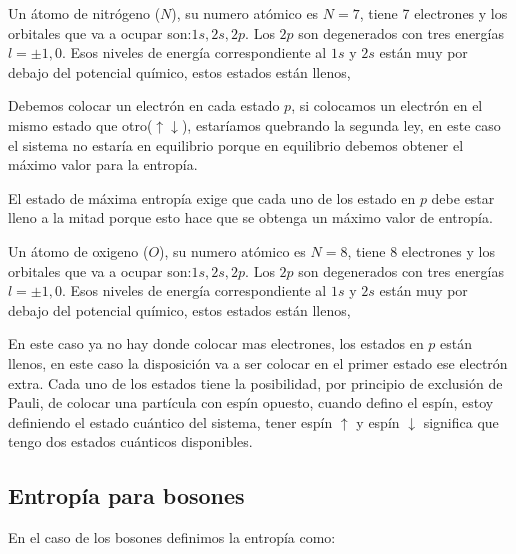 \documentclass[11pt,fleqn]{book}
\begin{document}
\begin{example}

Un átomo de nitrógeno ($N$), su numero atómico es $N=7$, tiene 7 electrones y los orbitales que va a ocupar son:$1s, 2s, 2p$. Los $2p$ son degenerados con tres energías $l=\pm1, 0$. Esos niveles de energía correspondiente al $1s$ y $2s$ están muy por debajo del potencial químico, estos estados están llenos, 


Debemos colocar un electrón en cada estado $p$, si colocamos un electrón en el mismo estado que otro($\uparrow\downarrow$), estaríamos quebrando la segunda ley, en este caso el sistema no estaría en equilibrio porque en equilibrio debemos obtener el máximo valor para la entropía. \\
\end{example}

El estado de máxima entropía exige que cada uno de los estado  en $p$ debe estar lleno a la mitad porque esto hace que se obtenga un  máximo valor de entropía. 

\begin{example}

Un átomo de oxigeno ($O$), su numero atómico es $N=8$, tiene 8 electrones y los orbitales que va a ocupar son:$1s, 2s, 2p$. Los $2p$ son degenerados con tres energías $l=\pm1, 0$. Esos niveles de energía correspondiente al $1s$ y $2s$ están muy por debajo del potencial químico, estos estados están llenos, 


En este caso ya no hay donde colocar mas electrones, los estados en $p$ están llenos, en este caso la disposición va a ser colocar en el primer estado ese electrón extra. Cada uno de los estados tiene la posibilidad, por principio de exclusión de Pauli, de colocar una partícula con espín opuesto, cuando defino el espín, estoy definiendo el estado cuántico del sistema, tener espín $\uparrow$ y espín $\downarrow$ significa que tengo dos estados cuánticos disponibles. 
\end{example}

\subsection{Entropía para bosones}

En el caso de los bosones definimos la entropía como:
\end{document}
